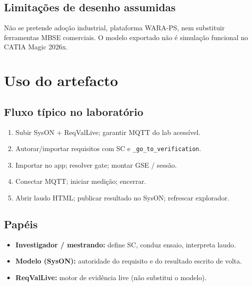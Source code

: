 \subsection{Limitações de desenho assumidas}

Não se pretende adoção industrial, plataforma WARA-PS, nem substituir ferramentas
MBSE comerciais. O modelo exportado não é simulação funcional no CATIA Magic
2026x.

\section{Uso do artefacto}
\label{sec:uso-artefacto}


\subsection{Fluxo típico no laboratório}

\begin{enumerate}
  \item Subir SysON + ReqValLive; garantir MQTT do lab acessível.
  \item Autorar/importar requisitos com SC e \texttt{\_go\_to\_verification}.
  \item Importar no app; resolver gate; montar GSE / sessão.
  \item Conectar MQTT; iniciar medição; encerrar.
  \item Abrir laudo HTML; publicar resultado no SysON; refrescar explorador.
\end{enumerate}

\subsection{Papéis}

\begin{itemize}
  \item \textbf{Investigador / mestrando:} define SC, conduz ensaio, interpreta
        laudo.
  \item \textbf{Modelo (SysON):} autoridade do requisito e do resultado escrito
        de volta.
  \item \textbf{ReqValLive:} motor de evidência live (não substitui o modelo).
\end{itemize}
